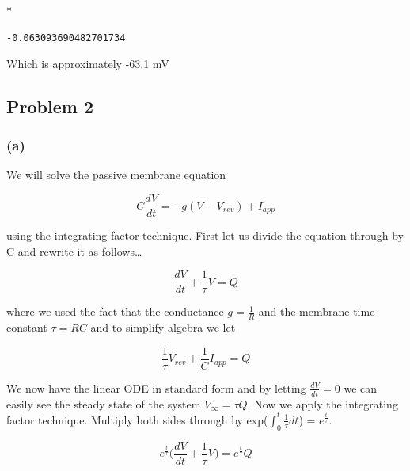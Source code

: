 \documentclass[letterpaper,10pt,english]{/usr/share/sphinx/texinputs/sphinxhowto}
\def\smaller{\fontsize{9.5pt}{9.5pt}\selectfont}
\newenvironment{InvisibleVerbatim}
        {\begin{mdframed}[leftmargin=0.1\linewidth,innerleftmargin=3pt,innerrightmargin=3pt, userdefinedwidth=1\linewidth, linewidth=0pt, linecolor=white, usetwoside=false]}
        {\end{mdframed}}
\begin{document}
        

            
                \makebox[0.1\linewidth]{\smaller\hfill\tt\color{nbframe-out-prompt}Out\hspace{4pt}{[}10{]}:\hspace{4pt}}\\*
                \vspace{-2.55\baselineskip}\begin{InvisibleVerbatim}
                \vspace{-0.5\baselineskip}
                \hspace{1pt}

\begin{alltt}-0.063093690482701734\end{alltt}

            \end{InvisibleVerbatim}
            
        
    
Which is approximately -63.1 mV\subsection{Problem 2}\label{problem-2}

\subsubsection{(a)}\label{a}

We will solve the passive membrane equation

\[C\frac{dV}{dt}=-g(V-V_{rev})+I_{app}\]

using the integrating factor technique. First let us divide the equation
through by C and rewrite it as follows\ldots{}

\[\frac{dV}{dt}+\frac{1}{\tau}V=Q\]

where we used the fact that the conductance $g=\frac{1}{R}$ and the
membrane time constant $\tau=RC$ and to simplify algebra we let

\[\frac{1}{\tau}V_{rev}+\frac{1}{C}I_{app}=Q\]

We now have the linear ODE in standard form and by letting
$\frac{dV}{dt}=0$ we can easily see the steady state of the system
$V_{\infty}= \tau Q$. Now we apply the integrating factor technique.
Multiply both sides through by exp($\int_0^t\frac{1}{\tau}dt$) =
$e^{\frac{t}{\tau}}$.

\[e^{\frac{t}{\tau}}\Big(\frac{dV}{dt}+\frac{1}{\tau}V\Big)=e^{\frac{t}{\tau}}Q\]
\end{document}
